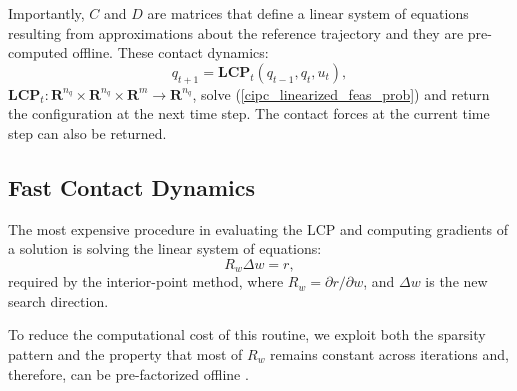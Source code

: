 Importantly, $C$ and $D$ are matrices that define a linear system of equations resulting from approximations about the reference trajectory and they are pre-computed offline. These contact dynamics:
\begin{equation}
	q_{t+1} = \textbf{LCP}_t(q_{t-1}, q_t, u_t),
\end{equation}
$\textbf{LCP}_t : \mathbf{R}^{n_q} \times \mathbf{R}^{n_q} \times \mathbf{R}^m \rightarrow \mathbf{R}^{n_q}$, solve (\ref{cipc_linearized_feas_prob}) and return the configuration at the next time step. The contact forces at the current time step can also be returned.

\subsection{Fast Contact Dynamics}
The most expensive procedure in evaluating the LCP and computing gradients of a solution is solving the linear system of equations:
\begin{equation}
	R_w \Delta w = r, \label{cipc_naive_solve}
\end{equation}
required by the interior-point method, where $R_w = \partial r / \partial w$, and $\Delta w$ is the new search direction. 

To reduce the computational cost of this routine, we exploit both the sparsity pattern and the property that most of $R_w$ remains constant across iterations and, therefore, can be pre-factorized offline \cite{yamazaki2017structure}. 

